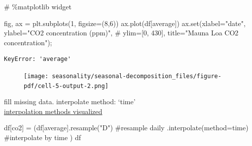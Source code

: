 \documentclass[
  letterpaper,
  DIV=11,
  numbers=noendperiod,
  oneside]{scrreprt}
\newenvironment{Shaded}{\begin{snugshade}}{\end{snugshade}}
\newcommand{\BuiltInTok}[1]{\textcolor[rgb]{0.00,0.23,0.31}{#1}}
\newcommand{\CommentTok}[1]{\textcolor[rgb]{0.37,0.37,0.37}{#1}}
\newcommand{\DecValTok}[1]{\textcolor[rgb]{0.68,0.00,0.00}{#1}}
\newcommand{\NormalTok}[1]{\textcolor[rgb]{0.00,0.23,0.31}{#1}}
\newcommand{\OperatorTok}[1]{\textcolor[rgb]{0.37,0.37,0.37}{#1}}
\newcommand{\StringTok}[1]{\textcolor[rgb]{0.13,0.47,0.30}{#1}}
\begin{document}
\begin{Shaded}
\begin{Highlighting}[]
\CommentTok{\# \%matplotlib widget}

\NormalTok{fig, ax }\OperatorTok{=}\NormalTok{ plt.subplots(}\DecValTok{1}\NormalTok{, figsize}\OperatorTok{=}\NormalTok{(}\DecValTok{8}\NormalTok{,}\DecValTok{6}\NormalTok{))}
\NormalTok{ax.plot(df[}\StringTok{\textquotesingle{}average\textquotesingle{}}\NormalTok{])}
\NormalTok{ax.}\BuiltInTok{set}\NormalTok{(xlabel}\OperatorTok{=}\StringTok{"date"}\NormalTok{,}
\NormalTok{       ylabel}\OperatorTok{=}\StringTok{"CO2 concentration (ppm)"}\NormalTok{,}
       \CommentTok{\# ylim=[0, 430],}
\NormalTok{       title}\OperatorTok{=}\StringTok{"Mauna Loa CO2 concentration"}\NormalTok{)}\OperatorTok{;}
\end{Highlighting}
\end{Shaded}

\begin{verbatim}
KeyError: 'average'
\end{verbatim}

\begin{figure}[H]

{\centering \texttt{[image: seasonality/seasonal-decomposition\_files/figure-pdf/cell-5-output-2.png]}

}

\end{figure}

fill missing data. interpolate method: `time'\\
\href{https://thepythonyouneed.com/how-to-interpolate-values-with-pandas/}{interpolation
methods visualized}

\begin{Shaded}
\begin{Highlighting}[]
\NormalTok{df[}\StringTok{\textquotesingle{}co2\textquotesingle{}}\NormalTok{] }\OperatorTok{=}\NormalTok{ (df[}\StringTok{\textquotesingle{}average\textquotesingle{}}\NormalTok{].resample(}\StringTok{"D"}\NormalTok{) }\CommentTok{\#resample daily}
\NormalTok{                          .interpolate(method}\OperatorTok{=}\StringTok{\textquotesingle{}time\textquotesingle{}}\NormalTok{) }\CommentTok{\#interpolate by time}
\NormalTok{            )}
\NormalTok{df}
\end{Highlighting}
\end{Shaded}
\end{document}
